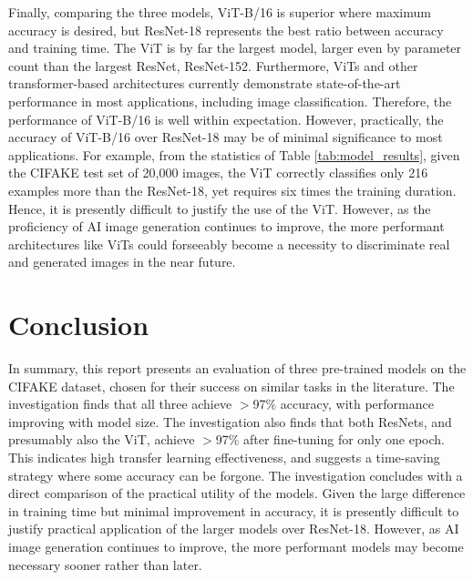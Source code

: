 Finally, comparing the three models, ViT-B/16 is superior where maximum accuracy is desired, but ResNet-18 represents the best ratio between accuracy and training time. The ViT is by far the largest model, larger even by parameter count than the largest ResNet, ResNet-152. Furthermore, ViTs and other transformer-based architectures currently demonstrate state-of-the-art performance in most applications, including image classification. Therefore, the performance of ViT-B/16 is well within expectation. However, practically, the accuracy of ViT-B/16 over ResNet-18 may be of minimal significance to most applications. For example, from the statistics of Table \ref{tab:model_results}, given the CIFAKE test set of 20,000 images, the ViT correctly classifies only 216 examples more than the ResNet-18, yet requires six times the training duration. Hence, it is presently difficult to justify the use of the ViT. However, as the proficiency of AI image generation continues to improve, the more performant architectures like ViTs could forseeably become a necessity to discriminate real and generated images in the near future.

\section{Conclusion}

In summary, this report presents an evaluation of three pre-trained models on the CIFAKE dataset, chosen for their success on similar tasks in the literature. The investigation finds that all three achieve $>$97\% accuracy, with performance improving with model size. The investigation also finds that both ResNets, and presumably also the ViT, achieve $>$97\% after fine-tuning for only one epoch. This indicates high transfer learning effectiveness, and suggests a time-saving strategy where some accuracy can be forgone. The investigation concludes with a direct comparison of the practical utility of the models. Given the large difference in training time but minimal improvement in accuracy, it is presently difficult to justify practical application of the larger models over ResNet-18. However, as AI image generation continues to improve, the more performant models may become necessary sooner rather than later.
